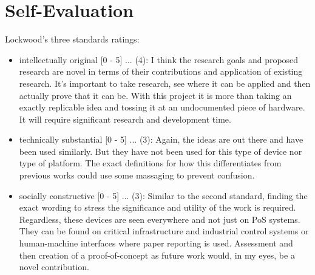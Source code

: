 \chapter*{Self-Evaluation}

\label{chap:evaluation}

Lockwood's three standards ratings:
\begin{itemize}
  \item intellectually original [0 - 5] ... (4): I think the research goals and proposed research are novel in terms of their contributions and application of existing research. It's important to take research, see where it can be applied and then actually prove that it can be. With this project it is more than taking an exactly replicable idea and tossing it at an undocumented piece of hardware. It will require significant research and development time.

  \item technically substantial [0 - 5] ... (3): Again, the ideas are out there and have been used similarly. But they have not been used for this type of device nor type of platform. The exact definitions for how this differentiates from previous works could use some massaging to prevent confusion.

  \item socially constructive [0 - 5] ... (3): Similar to the second standard, finding the exact wording to stress the significance and utility of the work is required. Regardless, these devices are seen everywhere and not just on PoS systems. They can be found on critical infrastructure and industrial control systems or human-machine interfaces where paper reporting is used. Assessment and then creation of a proof-of-concept as future work would, in my eyes, be a novel contribution.
\end{itemize}